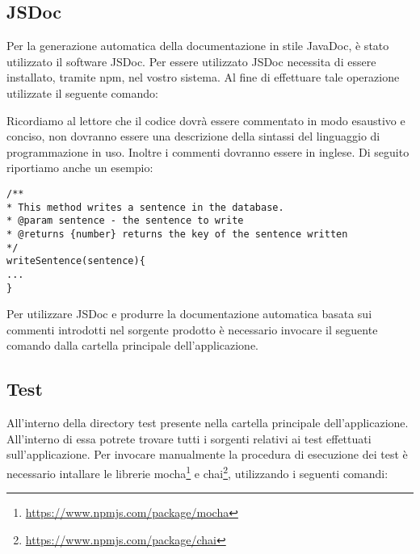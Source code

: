 \subsection{JSDoc}
Per la generazione automatica della documentazione in stile JavaDoc, è stato utilizzato il software JSDoc. 
Per essere utilizzato JSDoc necessita di essere installato, tramite npm, nel vostro sistema. Al fine di effettuare tale operazione utilizzate il seguente comando:

\begin{center}
	\noindent{}
\end{center}

Ricordiamo al lettore che il codice dovrà essere commentato in modo esaustivo e conciso, non dovranno essere una descrizione della sintassi del linguaggio di programmazione in uso. Inoltre i commenti dovranno essere in inglese. Di seguito riportiamo anche un esempio:

\begin{lstlisting}[caption=Esempio di commento ad un metodo]
/**
* This method writes a sentence in the database.
* @param sentence - the sentence to write
* @returns {number} returns the key of the sentence written
*/
writeSentence(sentence){
...
}
\end{lstlisting}

Per utilizzare JSDoc e produrre la documentazione automatica basata sui commenti introdotti nel sorgente prodotto è necessario invocare il seguente comando dalla cartella principale dell'applicazione.

\begin{center}
	\noindent{}
\end{center}
	
\subsection{Test}
All'interno della directory test presente nella cartella principale dell'applicazione. All'interno di essa potrete trovare tutti i sorgenti relativi ai test effettuati sull'applicazione.
Per invocare manualmente la procedura di esecuzione dei test è necessario intallare le librerie mocha\footnote{\url{https://www.npmjs.com/package/mocha}} e chai\footnote{\url{https://www.npmjs.com/package/chai}}, utilizzando i seguenti comandi:


